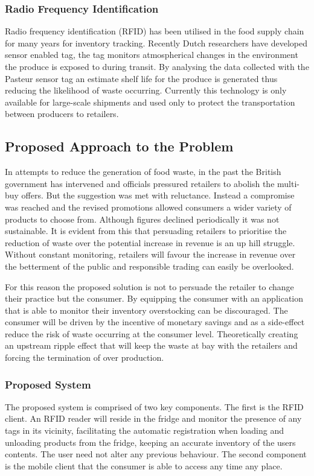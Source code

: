 \documentclass[a4paper, 11pt]{article}
\begin{document}
\subsubsection{Radio Frequency Identification} 
Radio frequency identification (RFID) has been utilised in the food supply chain for many years for inventory tracking. Recently Dutch researchers have developed sensor enabled tag, the tag monitors atmospherical changes in the environment the produce is exposed to during transit. By analysing the data collected with the Pasteur sensor tag an estimate shelf life for the produce is generated thus reducing the likelihood of waste occurring. Currently this technology is only available for large-scale shipments and used only to protect the transportation between producers to retailers. 

\subsection{Proposed Approach to the Problem}
In attempts to reduce the generation of food waste, in the past the British government has intervened and officials pressured retailers to abolish the multi-buy offers. But the suggestion was met with reluctance. Instead a compromise was reached and the revised promotions allowed consumers a wider variety of products to choose from. Although figures declined periodically it was not sustainable. It is evident from this that persuading retailers to prioritise the reduction of waste over the potential increase in revenue is an up hill struggle. Without constant monitoring, retailers will favour the increase in revenue over the betterment of the public and responsible trading can easily be overlooked. 

For this reason the proposed solution is not to persuade the retailer to change their practice but the consumer. By equipping the consumer with an application that is able to monitor their inventory overstocking can be discouraged. The consumer will be driven by the incentive of monetary savings and as a side-effect reduce the risk of waste occurring at the consumer level. Theoretically creating an upstream ripple effect that will keep the waste at bay with the retailers and forcing the termination of over production. 

\subsubsection{Proposed System}
The proposed system is comprised of two key components. The first is the RFID client. An RFID reader will reside in the fridge and monitor the presence of any tags in its vicinity, facilitating the automatic registration when loading and unloading products from the fridge, keeping an accurate inventory of the users contents. The user need not alter any previous behaviour. The second component is the mobile client that the consumer is able to access any time any place.
\end{document}

